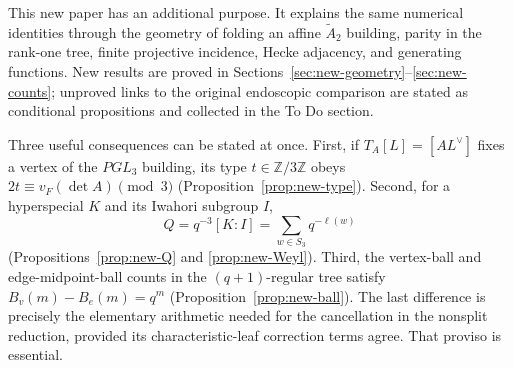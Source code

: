 \documentclass[12pt,letterpaper]{amsart}
\numberwithin{equation}{section}
\theoremstyle{definition}
\theoremstyle{plain}
\begin{document}
This new paper has an additional purpose. It explains the same numerical
identities through the geometry of folding an affine $\widetilde A_2$
building, parity in the rank-one tree, finite projective incidence,
Hecke adjacency, and generating functions. New results are proved in
Sections~\ref{sec:new-geometry}--\ref{sec:new-counts}; unproved links
to the original endoscopic comparison are stated as conditional
propositions and collected in the To Do section.

Three useful consequences can be stated at once. First, if
$T_A[L]=[A L^\vee]$ fixes a vertex of the $PGL_3$ building, its type
$t\in\mathbb Z/3\mathbb Z$ obeys
$2t\equiv v_F(\det A)\pmod3$ (Proposition~\ref{prop:new-type}).
Second, for a hyperspecial $K$ and its Iwahori subgroup $I$,
\[
Q=q^{-3}[K:I]=\sum_{w\in S_3}q^{-\ell(w)}
\]
(Propositions~\ref{prop:new-Q} and \ref{prop:new-Weyl}).
Third, the vertex-ball and edge-midpoint-ball counts in the
$(q+1)$-regular tree satisfy $B_v(m)-B_e(m)=q^m$
(Proposition~\ref{prop:new-ball}). The last difference is precisely
the elementary arithmetic needed for the cancellation in the
nonsplit reduction, provided its characteristic-leaf correction terms
agree. That proviso is essential.
\end{document}
